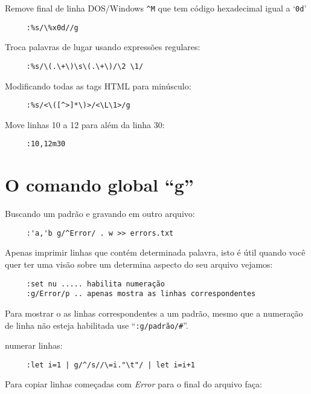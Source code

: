 Remove final de linha DOS/Windows \verb|^M| que tem código hexadecimal igual a
`{\tt 0d}'

\begin{verbatim}
     :%s/\%x0d//g
\end{verbatim}

Troca palavras de lugar usando expressões regulares:

\begin{verbatim}
     :%s/\(.\+\)\s\(.\+\)/\2 \1/
\end{verbatim}

Modificando todas as tags HTML para minúsculo:

\begin{verbatim}
     :%s/<\([^>]*\)>/<\L\1>/g
\end{verbatim}

Move linhas 10 a 12 para além da linha 30:

\begin{verbatim}
     :10,12m30
\end{verbatim}

\section{O comando global ``g''}\label{sec:O comando global ``g''}

Buscando um padrão e gravando em outro arquivo:

\begin{verbatim}
     :'a,'b g/^Error/ . w >> errors.txt
\end{verbatim}

Apenas imprimir linhas que contém determinada palavra, isto é útil
quando você quer ter uma visão sobre um determina aspecto
do seu arquivo vejamos:

\begin{verbatim}
     :set nu ..... habilita numeração
     :g/Error/p .. apenas mostra as linhas correspondentes
\end{verbatim}

{\Large {}} Para mostrar o as linhas correspondentes a um padrão, mesmo que 
a numeração de linha não esteja habilitada use ``{\tt :g/padrão/\#}''.

numerar linhas:

\begin{verbatim}
     :let i=1 | g/^/s//\=i."\t"/ | let i=i+1
\end{verbatim}

Para copiar linhas começadas com {\em Error} para o final do arquivo faça:

